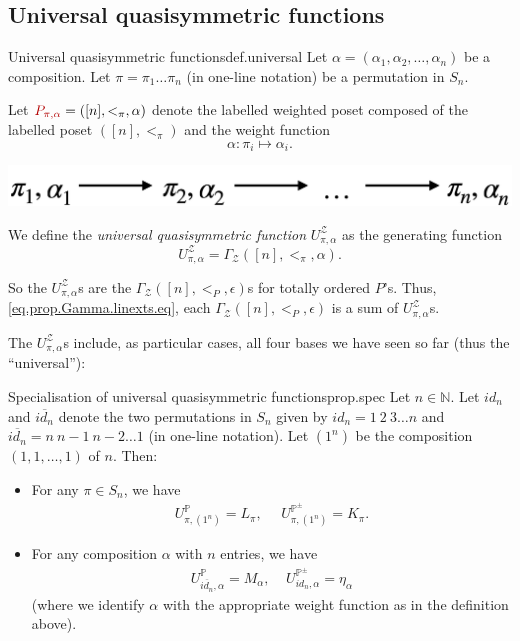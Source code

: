 \documentclass[numbers=enddot,12pt,final,onecolumn,notitlepage]{scrartcl}%
\newcommand{\NN}{\mathbb{N}} %
\newcommand{\PP}{\mathbb{P}} %
\newcommand{\tup}[1]{\left( #1 \right)}
\newcommand{\defn}[1]{{\color{darkred}\emph{#1}}}
\newcommand{\defnm}[1]{{\color{darkred} #1}}
\newcommand{\0}{\phantom{c}}
\begin{document}
\subsection{Universal quasisymmetric functions}
\begin{definition}{Universal quasisymmetric functions}{def.universal}
Let $\alpha = (\alpha_1, \alpha_2, \ldots, \alpha_n)$ be a composition.
Let $\pi=\pi_1\dots\pi_n$ (in one-line notation) be a permutation in $S_n$.

Let $\defnm{P_{\pi,\alpha}} = ([n],<_\pi,\alpha)$ denote the labelled weighted poset composed of the labelled poset $([n], <_\pi)$ and the weight function
\[
\alpha : \pi_i \mapsto \alpha_i .
\]
\begin{center}
\includegraphics[scale=0.20]{PosetMonomial.pdf}
 \label{fig : monomial}
 \end{center}
We define the \defn{universal quasisymmetric function} $U^\mathcal{Z}_{\pi,\alpha}$ as the generating function
\begin{equation}
U^\mathcal{Z}_{\pi,\alpha} = \Gamma_\mathcal{Z}([n],<_\pi, \alpha).
\end{equation}
\end{definition}

So the $U^\mathcal{Z}_{\pi,\alpha}$s are the $\Gamma_\mathcal{Z}([n], <_P, \epsilon)$s for totally ordered $P$'s.
Thus, \eqref{eq.prop.Gamma.linexts.eq}, each $\Gamma_\mathcal{Z}([n], <_P, \epsilon)$ is a sum of $U^\mathcal{Z}_{\pi,\alpha}$s.

The $U^\mathcal{Z}_{\pi,\alpha}$s include, as particular cases, all four bases we have seen so far (thus the ``universal''):

\begin{proposition}{Specialisation of universal quasisymmetric functions}{prop.spec}
\indent Let $n \in \NN$. Let \defn{$id_{n}$} and \defn{$\overline{id_{n}}$} denote the two permutations in $S_n$ given by $id_{n} = 1~2~3\dots n$ and $\overline{id_{n}} = n~n-1~n-2\dots 1$ (in one-line notation). Let \defn{$(1^n)$} be the composition $\tup{1, 1, \ldots, 1}$ of $n$. Then:
\begin{itemize}
\item For any $\pi \in S_n$, we have
\begin{align*}
U^\mathcal{\PP}_{\pi,(1^n)} = L_\pi, ~~~~~~U^\mathcal{\PP^\pm}_{\pi,(1^n)} = K_\pi .
\end{align*}
\item For any composition $\alpha$ with $n$ entries, we have
\begin{align}
U^{\mathcal{\PP}}_{\overline{id_{n}},\alpha} = M_{\alpha},
~~~~~U^{\mathcal{\PP^\pm}}_{id_{n},\alpha} = \eta_{\alpha}
\label{eq : UE}
\end{align}
(where we identify $\alpha$ with the appropriate weight function as in the definition above).
\end{itemize}

\end{proposition}
\end{document}
